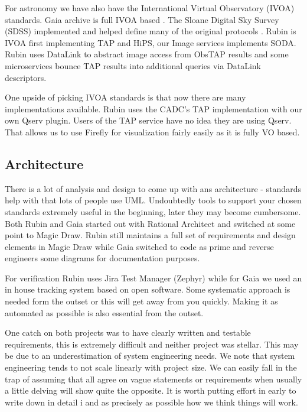 \documentclass[11pt,twoside]{article}
\begin{document}
For astronomy we have also have the International Virtual Observatory (IVOA) standards. Gaia archive is full IVOA based \citep{2019ASPC..523..445S,2015scop.confE...8G}. The Sloane Digital Sky Survey (SDSS) implemented and helped define many of the original protocols \citep{2004AAS...20511301T}.
Rubin is IVOA first implementing TAP and  HiPS,
our Image services implements SODA.
Rubin uses DataLink to abstract image access from ObsTAP results and
some microservices  bounce TAP results into additional queries via DataLink descriptors.

One upside of picking IVOA standards is that now there are many implementations available.
Rubin uses the CADC's TAP implementation  with our own Qserv plugin.
Users of the TAP service have no idea they are using Qserv.
That allows us to use Firefly for visualization fairly easily as it is
fully VO based.

\subsection{Architecture}
There is a lot of analysis and design to come up with ans architecture - standards help with that lots of people use UML.
Undoubtedly tools to support your chosen standards extremely useful in the beginning, later they may become cumbersome. Both Rubin and Gaia started out with Rational Architect and switched at some point to Magic Draw.
Rubin still maintains a full set of requirements and design elements in Magic Draw while Gaia switched to code as prime and reverse engineers some diagrams for documentation purposes.

For verification  Rubin uses  Jira Test Manager (Zephyr) while for Gaia we used an in house tracking system based on open software.
Some systematic approach is needed form the outset or this will get away from you quickly.
Making it as automated as possible is also essential from the outset.

One catch on both projects was to have clearly written and testable requirements, this is extremely difficult and neither project was stellar.
This may be due to an underestimation of system engineering needs.
We note that system engineering tends to not scale linearly with project size.
We can easily fall in the trap of assuming that all agree on vague statements or requirements when usually a little delving will show quite the opposite.
It is worth putting effort in early to write down in detail i and as precisely as possible how we think things will work.
\end{document}
